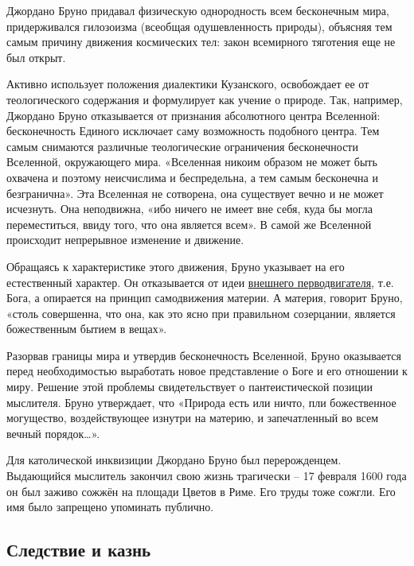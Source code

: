 \documentclass[
]{article}
\begin{document}
Джордано Бруно придавал физическую однородность всем бесконечным мира,
придерживался гилозоизма (всеобщая одушевленность природы), объясняя тем
самым причину движения космических тел: закон всемирного тяготения еще
не был открыт.

Активно использует положения диалектики Кузанского, освобождает ее от
теологического содержания и формулирует как учение о природе. Так,
например, Джордано Бруно отказывается от признания абсолютного центра
Вселенной: бесконечность Единого исключает саму возможность подобного
центра. Тем самым снимаются различные теологические ограничения
бесконечности Вселенной, окружающего мира. «Вселенная никоим образом не
может быть охвачена и поэтому неисчислима и беспредельна, а тем самым
бесконечна и безгранична». Эта Вселенная не сотворена, она существует
вечно и не может исчезнуть. Она неподвижна, «ибо ничего не имеет вне
себя, куда бы могла переместиться, ввиду того, что она является всем». В
самой же Вселенной происходит непрерывное изменение и движение.

Обращаясь к характеристике этого движения, Бруно указывает на его
естественный характер. Он отказывается от идеи
\protect\hyperlink{ux43fux44fux442ux44c-ux434ux43eux43aux430ux437ux430ux442ux435ux43bux44cux441ux442ux432-ux431ux43eux433ux430}{внешнего
перводвигателя}, т.е. Бога, а опирается на принцип самодвижения материи.
А материя, говорит Бруно, «столь совершенна, что она, как это ясно при
правильном созерцании, является божественным бытием в вещах».

Разорвав границы мира и утвердив бесконечность Вселенной, Бруно
оказывается перед необходимостью выработать новое представление о Боге и
его отношении к миру. Решение этой проблемы свидетельствует о
пантеистической позиции мыслителя. Бруно утверждает, что «Природа есть
или ничто, пли божественное могущество, воздействующее изнутри на
материю, и запечатленный во всем вечный порядок\ldots».

Для католической инквизиции Джордано Бруно был перерожденцем. Выдающийся
мыслитель закончил свою жизнь трагически -- 17 февраля 1600 года он был
заживо сожжён на площади Цветов в Риме. Его труды тоже сожгли. Его имя
было запрещено упоминать публично.

\hypertarget{ux441ux43bux435ux434ux441ux442ux432ux438ux435-ux438-ux43aux430ux437ux43dux44c}{%
\subsection{Следствие и
казнь}\label{ux441ux43bux435ux434ux441ux442ux432ux438ux435-ux438-ux43aux430ux437ux43dux44c}}
\end{document}
